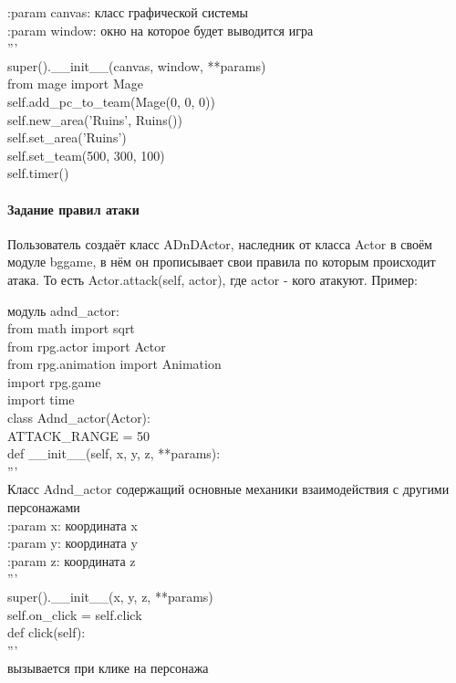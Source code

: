 :param canvas: класс графической системы\\
:param window: окно на которое будет выводится игра\\
'''\\
super().\_\_init\_\_(canvas, window, **params)\\
from mage import Mage\\
self.add\_pc\_to\_team(Mage(0, 0, 0))\\
self.new\_area('Ruins', Ruins())\\
self.set\_area('Ruins')\\
self.set\_team(500, 300, 100)\\
self.timer()\\

\paragraph{Задание правил атаки}
Пользователь создаёт класс ADnDActor, наследник от класса Actor в своём модуле bggame, в нём он прописывает свои правила по которым происходит атака. То есть Actor.attack(self, actor), где actor - кого атакуют.
Пример:

модуль adnd\_actor:\\
from math import sqrt\\
from rpg.actor import Actor\\
from rpg.animation import Animation\\
import rpg.game\\
import time\\

class Adnd\_actor(Actor):\\

ATTACK\_RANGE = 50\\

def \_\_init\_\_(self, x, y, z, **params):\\
'''\\
Класс Adnd\_actor содержащий основные механики взаимодействия с другими персонажами\\

:param x: координата x\\
:param y: координата y\\
:param z: координата z\\
'''\\
super().\_\_init\_\_(x, y, z, **params)\\
self.on\_click = self.click\\

def click(self):\\
'''\\
вызывается при клике на персонажа\\

